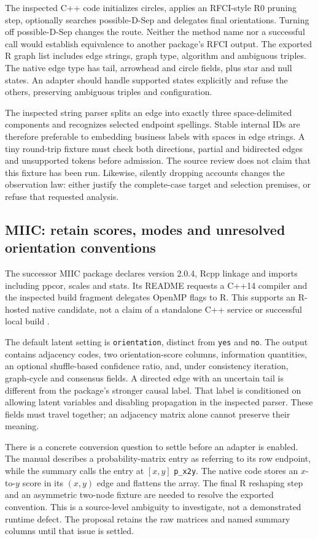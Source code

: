 The inspected C++ code initializes circles, applies an RFCI-style R0 pruning
step, optionally searches possible-D-Sep and delegates final orientations.
Turning off possible-D-Sep changes the route. Neither the method name nor a
successful call would establish equivalence to another package's RFCI output.
The exported R graph list includes edge strings, graph type, algorithm and
ambiguous triples. The native edge type has tail, arrowhead and circle fields,
plus star and null states. An adapter should handle supported states explicitly
and refuse the others, preserving ambiguous triples and configuration.

The inspected string parser splits an edge into exactly three space-delimited
components and recognizes selected endpoint spellings. Stable internal IDs
are therefore preferable to embedding business labels with spaces in edge
strings. A tiny round-trip fixture must check both directions, partial and
bidirected edges and unsupported tokens before admission. The source review
does not claim that this fixture has been run. Likewise, silently dropping
accounts changes the observation law: either justify the complete-case target
and selection premises, or refuse that requested analysis.

\subsection{MIIC: retain scores, modes and unresolved orientation conventions}

The successor MIIC package declares version 2.0.4, Rcpp linkage and imports
including ppcor, scales and stats. Its README requests a C++14 compiler and
the inspected build fragment delegates OpenMP flags to R. This supports an
R-hosted native candidate, not a claim of a standalone C++ service or successful
local build \citep{exec14_native_miic}.

The default latent setting is \texttt{orientation}, distinct from
\texttt{yes} and \texttt{no}. The output contains adjacency codes, two
orientation-score columns, information quantities, an optional shuffle-based
confidence ratio, and, under consistency iteration, graph-cycle and consensus
fields. A directed edge with an uncertain tail is different from the package's
stronger causal label. That label is conditioned on allowing latent variables
and disabling propagation in the inspected parser. These fields must travel
together; an adjacency matrix alone cannot preserve their meaning.

There is a concrete conversion question to settle before an adapter is enabled.
The manual describes a probability-matrix entry as referring to its row
endpoint, while the summary calls the entry at $[x,y]$ \texttt{p\_x2y}.
The native code stores an $x$-to-$y$ score in its $(x,y)$ edge and flattens
the array. The final R reshaping step and an asymmetric two-node fixture are
needed to resolve the exported convention. This is a source-level ambiguity
to investigate, not a demonstrated runtime defect. The proposal retains the
raw matrices and named summary columns until that issue is settled.

